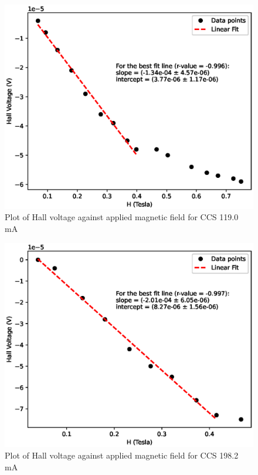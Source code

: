 
\begin{figure}
    \centering
    \includegraphics[width=1\columnwidth]{images/119rh.eps}
    \caption{Plot of Hall voltage against applied magnetic field for CCS 119.0 mA}
    \label{rh1}
\end{figure}
\begin{figure}
    \centering
    \includegraphics[width=1\columnwidth]{images/198rh.eps}
    \caption{Plot of Hall voltage against applied magnetic field for CCS 198.2 mA}
    \label{rh2}
\end{figure}

